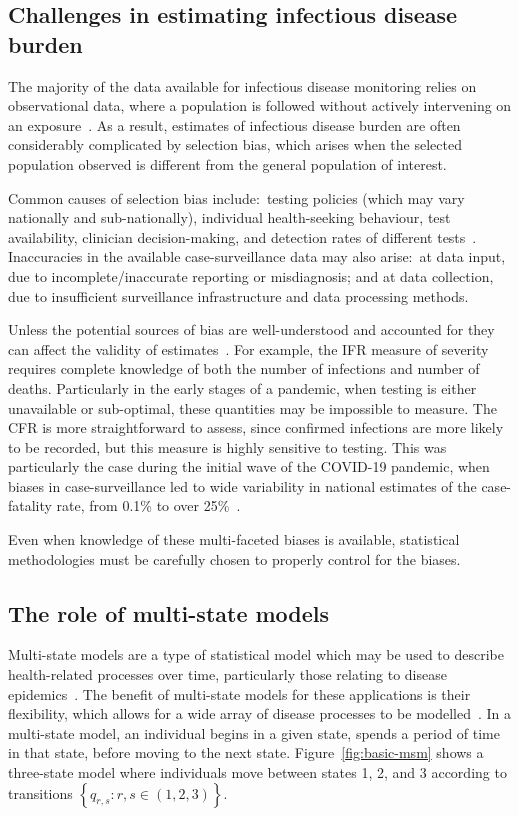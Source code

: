 \subsection{Challenges in estimating infectious disease burden}

The majority of the data available for infectious disease monitoring relies on observational data, where a population is followed without actively intervening on an exposure~\parencite{Baker2023-me}. As a result, estimates of infectious disease burden are often considerably complicated by selection bias, which arises when the selected population observed is different from the general population of interest.

Common causes of selection bias include:\ testing policies (which may vary nationally and sub-nationally), individual health-seeking behaviour, test availability, clinician decision-making, and detection rates of different tests~\parencite{Hernan2004-ht}. Inaccuracies in the available case-surveillance data may also arise:\ at data input, due to incomplete/inaccurate reporting or misdiagnosis; and at data collection, due to insufficient surveillance infrastructure and data processing methods.

Unless the potential sources of bias are well-understood and accounted for they can affect the validity of estimates~\parencite{Westreich2012-kq}. For example, the IFR measure of severity requires complete knowledge of both the number of infections and number of deaths. Particularly in the early stages of a pandemic, when testing is either unavailable or sub-optimal, these quantities may be impossible to measure. The CFR is more straightforward to assess, since confirmed infections are more likely to be recorded, but this measure is highly sensitive to testing. This was particularly the case during the initial wave of the COVID-19 pandemic, when biases in case-surveillance led to wide variability in national estimates of the case-fatality rate, from 0.1\% to over 25\%~\parencite{World_Health_Organization2020-kc, UK-Health-Security-Agency2020-wc}.

Even when knowledge of these multi-faceted biases is available, statistical methodologies must be carefully chosen to properly control for the biases.

\subsection{The role of multi-state models}

Multi-state models are a type of statistical model which may be used to describe health-related processes over time, particularly those relating to disease epidemics~\parencite{van-den-Hout2016-xy, Vynnycky2010-md}. The benefit of multi-state models for these applications is their flexibility, which allows for a wide array of disease processes to be modelled~\parencite{Hougaard1999-rw}. In a multi-state model, an individual begins in a given state, spends a period of time in that state, before moving to the next state. Figure~\ref{fig:basic-msm} shows a three-state model where individuals move between states 1, 2, and 3 according to transitions $\left\{q_{r,s} : r,s \in (1,2,3)\right\}$.

